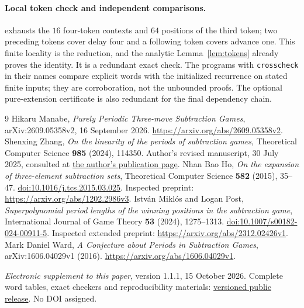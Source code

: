 \documentclass[11pt]{article}
\theoremstyle{remark}\newtheorem{remark}[theorem]{Remark}
\begin{document}
\paragraph{Local token check and independent comparisons.}
 exhausts the $16$ four-token contexts
and $64$ positions of the third token; two preceding tokens cover delay
four and a following token covers advance one. This finite locality is
the reduction, and the analytic Lemma~\ref{lem:tokens} already proves the
identity. It is a redundant exact check. The programs with
\texttt{crosscheck} in their names compare explicit words with the
initialized recurrence on stated finite inputs; they are corroboration,
not the unbounded proofs. The optional pure-extension certificate is
also redundant for the final dependency chain.


\begin{thebibliography}{9}
 Hikaru Manabe, \emph{Purely Periodic Three-move Subtraction Games}, arXiv:2609.05358v2, 16 September 2026. \url{https://arxiv.org/abs/2609.05358v2}.
 Shenxing Zhang, \emph{On the linearity of the periods of subtraction games}, Theoretical Computer Science \textbf{985} (2024), 114350. Author's revised manuscript, 30 July 2025, consulted at \href{https://zhangshenxing.github.io/publications/Zhang2024tcs%20On%20the%20linearity%20of%20the%20periods%20of%20subtraction%20games.pdf}{the author's publication page}.
 Nhan Bao Ho, \emph{On the expansion of three-element subtraction sets}, Theoretical Computer Science \textbf{582} (2015), 35--47. \href{https://doi.org/10.1016/j.tcs.2015.03.025}{doi:10.1016/j.tcs.2015.03.025}. Inspected preprint: \url{https://arxiv.org/abs/1202.2986v3}.
 Istv\'an Mikl\'os and Logan Post, \emph{Superpolynomial period lengths of the winning positions in the subtraction game}, International Journal of Game Theory \textbf{53} (2024), 1275--1313. \href{https://doi.org/10.1007/s00182-024-00911-5}{doi:10.1007/s00182-024-00911-5}. Inspected extended preprint: \url{https://arxiv.org/abs/2312.02426v1}.
 Mark Daniel Ward, \emph{A Conjecture about Periods in Subtraction Games}, arXiv:1606.04029v1 (2016). \url{https://arxiv.org/abs/1606.04029v1}.

 \emph{Electronic supplement to this paper}, version 1.1.1, 15 October 2026. Complete word tables, exact checkers and reproducibility materials: \href{https://github.com/TommyMaHaoKun/subtraction-games-a4ac/releases/tag/v1.1.1}{versioned public release}. No DOI assigned.

\end{thebibliography}
\end{document}
